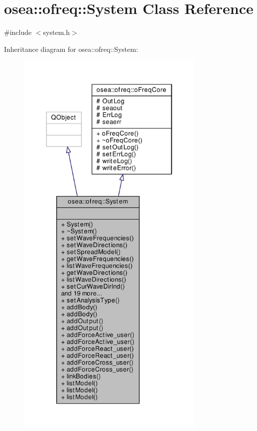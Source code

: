 \hypertarget{classosea_1_1ofreq_1_1_system}{\section{osea\-:\-:ofreq\-:\-:System Class Reference}
\label{classosea_1_1ofreq_1_1_system}
}


{\ttfamily \#include $<$system.\-h$>$}



Inheritance diagram for osea\-:\-:ofreq\-:\-:System\-:\nopagebreak
\begin{figure}[H]
\begin{center}
\leavevmode
\includegraphics[height=550pt]{classosea_1_1ofreq_1_1_system__inherit__graph}
\end{center}
\end{figure}
